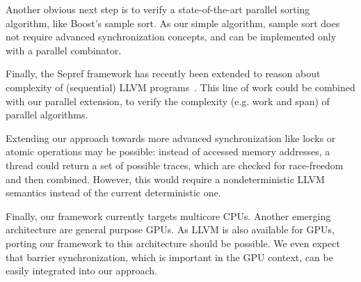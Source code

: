 \documentclass[runningheads]{llncs}
\begin{document}
      Another obvious next step is to verify a state-of-the-art parallel sorting algorithm,
      like Boost's sample sort. As our simple algorithm, sample sort does not require
      advanced synchronization concepts, and can be implemented only with a parallel combinator.

      Finally, the Sepref framework has recently been extended to reason about complexity of (sequential)
      LLVM programs~\cite{HaLa21-toplas,HaLa21}. This line of work could be combined with our parallel extension, to verify the
      complexity (e.g. work and span) of parallel algorithms.

      Extending our approach towards more advanced
      synchronization like locks or atomic operations may be possible: instead of accessed memory addresses,
      a thread could return a set of possible traces, which are checked for race-freedom and then combined.
      However, this would require a nondeterministic LLVM semantics instead of the current deterministic one.

      Finally, our framework currently targets multicore CPUs. Another emerging architecture are general purpose GPUs.
      As LLVM is also available for GPUs, porting our framework to this architecture should be possible.
      We even expect that barrier synchronization, which is important in the GPU context, can be easily integrated into our approach.


%
%
%
%
%
%
%

\clearpage




\end{document}
